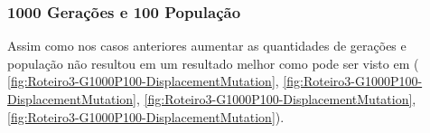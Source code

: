 \begin{center}
	\label{fig:Roteiro3-G500P50-SwapMutation}
\end{center}

\subsubsection{1000 Gerações e 100 População}

Assim como nos casos anteriores aumentar as quantidades de gerações e população não resultou em um resultado melhor como pode ser visto em ( \ref{fig:Roteiro3-G1000P100-DisplacementMutation},  \ref{fig:Roteiro3-G1000P100-DisplacementMutation}, \ref{fig:Roteiro3-G1000P100-DisplacementMutation}, \ref{fig:Roteiro3-G1000P100-DisplacementMutation}).

